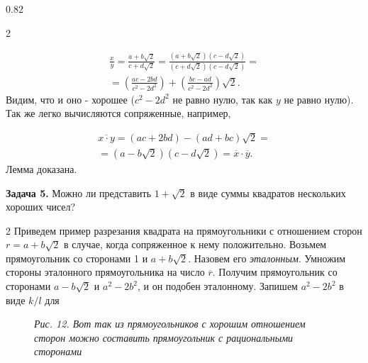 \begin{textblock*}{0.82\paperwidth}
\begin{multicols}{2}
{    \begin{multline*}
    \frac{x}{y}=\frac{a + b\sqrt{2}}{c + d\sqrt{2}}=\frac{(a + b\sqrt{2})(c - d\sqrt{2})}{(c + d\sqrt{2})(c - d\sqrt{2})}= \\
    = \left(\frac{ac - 2bd}{c^2 - 2d^2}\right) + \left(\frac{bc - ad}{c^2 - 2d^2}\right)\sqrt{2}.
    \end{multline*}
    Видим, что и оно - хорошее ($c^2 - 2d^2$ не равно нулю, так как $y$ не равно нулю). Так же легко вычисляются сопряженные, например, \par
    \begin{multline*}
    \overline{x \cdot y}=(ac + 2bd) - (ad + bc)\sqrt{2}= \\ 
    = (a - b\sqrt{2})(c - d\sqrt{2}) = \overline{x} \cdot \overline{y}.
    \end{multline*}
    Лемма доказана. \par {\small\textbf{Задача 5.} Можно ли представить $1 + \sqrt{2}$ в виде суммы квадратов нескольких хороших чисел?} \par
    \begin{multicols}{2}
    Приведем пример разрезания квадрата на прямоугольники с отношением сторон $r = a + b\sqrt{2}$ в случае, когда сопряженное к нему положительно. Возьмем прямоугольник со сторонами 1 и $a + b\sqrt{2}$. Назовем его \textit{эталонным}. Умножим стороны эталонного прямоугольника на число $\overline{r}$. Получим прямоугольник со сторонами $a - b\sqrt{2}$ и $a^2 - 2b^2$, и он подобен эталонному. Запишем $a^2-2b^2$ в виде $k/l$ для
    \begin{figure}[h]
    \caption*{\textsl{Рис. 12. Вот так из прямоугольников с хорошим отношением сторон можно составить прямоугольник с рациональными сторонами}}
    \end{figure}
    \end{multicols}
    }
    \end{multicols}
\end{textblock*}
